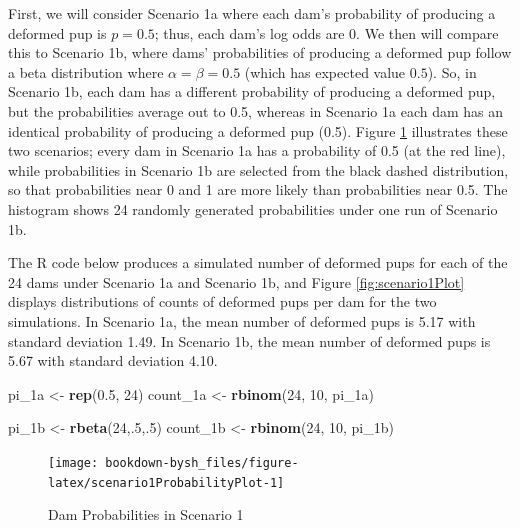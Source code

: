 \documentclass[
]{krantz}
\newenvironment{Shaded}{\begin{snugshade}}{\end{snugshade}}
\newcommand{\DecValTok}[1]{\textcolor[rgb]{0.06,0.06,0.06}{#1}}
\newcommand{\FloatTok}[1]{\textcolor[rgb]{0.06,0.06,0.06}{#1}}
\newcommand{\KeywordTok}[1]{\textcolor[rgb]{0.27,0.27,0.27}{\textbf{#1}}}
\newcommand{\NormalTok}[1]{#1}
\newcommand{\StringTok}[1]{\textcolor[rgb]{0.5,0.5,0.5}{#1}}
\begin{document}
First, we will consider Scenario 1a where each dam's probability of producing a deformed pup is \(p = 0.5\); thus, each dam's log odds are 0. We then will compare this to Scenario 1b, where dams' probabilities of producing a deformed pup follow a beta distribution where \(\alpha = \beta = 0.5\) (which has expected value \(0.5\)). So, in Scenario 1b, each dam has a different probability of producing a deformed pup, but the probabilities average out to 0.5, whereas in Scenario 1a each dam has an identical probability of producing a deformed pup (0.5). Figure \ref{fig:scenario1ProbabilityPlot} illustrates these two scenarios; every dam in Scenario 1a has a probability of 0.5 (at the red line), while probabilities in Scenario 1b are selected from the black dashed distribution, so that probabilities near 0 and 1 are more likely than probabilities near 0.5. The histogram shows 24 randomly generated probabilities under one run of Scenario 1b.

The R code below produces a simulated number of deformed pups for each of the 24 dams under Scenario 1a and Scenario 1b, and Figure \ref{fig:scenario1Plot} displays distributions of counts of deformed pups per dam for the two simulations. In Scenario 1a, the mean number of deformed pups is 5.17 with standard deviation 1.49. In Scenario 1b, the mean number of deformed pups is 5.67 with standard deviation 4.10.

\begin{Shaded}
\begin{Highlighting}[]
\NormalTok{pi_1a <-}\StringTok{ }\KeywordTok{rep}\NormalTok{(}\FloatTok{0.5}\NormalTok{, }\DecValTok{24}\NormalTok{)}
\NormalTok{count_1a <-}\StringTok{ }\KeywordTok{rbinom}\NormalTok{(}\DecValTok{24}\NormalTok{, }\DecValTok{10}\NormalTok{, pi_1a)}

\NormalTok{pi_1b <-}\StringTok{ }\KeywordTok{rbeta}\NormalTok{(}\DecValTok{24}\NormalTok{,.}\DecValTok{5}\NormalTok{,.}\DecValTok{5}\NormalTok{)  }
\NormalTok{count_1b <-}\StringTok{ }\KeywordTok{rbinom}\NormalTok{(}\DecValTok{24}\NormalTok{, }\DecValTok{10}\NormalTok{, pi_1b)  }
\end{Highlighting}
\end{Shaded}

\begin{figure}

{\centering \texttt{[image: bookdown-bysh\_files/figure-latex/scenario1ProbabilityPlot-1]} 

}

\caption{Dam Probabilities in Scenario 1}\label{fig:scenario1ProbabilityPlot}
\end{figure}
\end{document}
